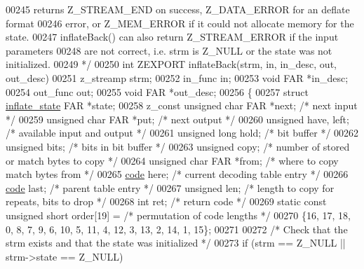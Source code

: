\begin{DoxyCode}
00245 \textcolor{comment}{   returns Z\_STREAM\_END on success, Z\_DATA\_ERROR for an deflate format}
00246 \textcolor{comment}{   error, or Z\_MEM\_ERROR if it could not allocate memory for the state.}
00247 \textcolor{comment}{   inflateBack() can also return Z\_STREAM\_ERROR if the input parameters}
00248 \textcolor{comment}{   are not correct, i.e. strm is Z\_NULL or the state was not initialized.}
00249 \textcolor{comment}{ */}
00250 \textcolor{keywordtype}{int} ZEXPORT inflateBack(strm, in, in\_desc, out, out\_desc)
00251 z\_streamp strm;
00252 in\_func in;
00253 \textcolor{keywordtype}{void} FAR *in\_desc;
00254 out\_func out;
00255 \textcolor{keywordtype}{void} FAR *out\_desc;
00256 \{
00257     \textcolor{keyword}{struct }\hyperlink{structinflate__state}{inflate\_state} FAR *state;
00258     z\_const \textcolor{keywordtype}{unsigned} \textcolor{keywordtype}{char} FAR *next;    \textcolor{comment}{/* next input */}
00259     \textcolor{keywordtype}{unsigned} \textcolor{keywordtype}{char} FAR *put;     \textcolor{comment}{/* next output */}
00260     \textcolor{keywordtype}{unsigned} have, left;        \textcolor{comment}{/* available input and output */}
00261     \textcolor{keywordtype}{unsigned} \textcolor{keywordtype}{long} hold;         \textcolor{comment}{/* bit buffer */}
00262     \textcolor{keywordtype}{unsigned} bits;              \textcolor{comment}{/* bits in bit buffer */}
00263     \textcolor{keywordtype}{unsigned} copy;              \textcolor{comment}{/* number of stored or match bytes to copy */}
00264     \textcolor{keywordtype}{unsigned} \textcolor{keywordtype}{char} FAR *from;    \textcolor{comment}{/* where to copy match bytes from */}
00265     \hyperlink{structcode}{code} here;                  \textcolor{comment}{/* current decoding table entry */}
00266     \hyperlink{structcode}{code} last;                  \textcolor{comment}{/* parent table entry */}
00267     \textcolor{keywordtype}{unsigned} len;               \textcolor{comment}{/* length to copy for repeats, bits to drop */}
00268     \textcolor{keywordtype}{int} ret;                    \textcolor{comment}{/* return code */}
00269     \textcolor{keyword}{static} \textcolor{keyword}{const} \textcolor{keywordtype}{unsigned} \textcolor{keywordtype}{short} order[19] = \textcolor{comment}{/* permutation of code lengths */}
00270         \{16, 17, 18, 0, 8, 7, 9, 6, 10, 5, 11, 4, 12, 3, 13, 2, 14, 1, 15\};
00271 
00272     \textcolor{comment}{/* Check that the strm exists and that the state was initialized */}
00273     \textcolor{keywordflow}{if} (strm == Z\_NULL || strm->state == Z\_NULL)

\end{DoxyCode}
